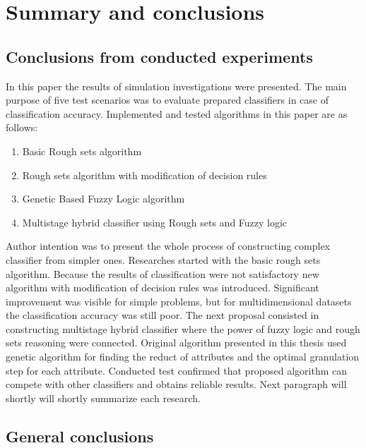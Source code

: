 \section{Summary and conclusions}
\label{cha:Summary}
\subsection{Conclusions from conducted experiments}
In this paper the results of simulation investigations were presented. The main
purpose of five test scenarios was to evaluate prepared classifiers in case of
classification accuracy. Implemented and tested algorithms in this paper are as follows:
\begin{enumerate}
    \item Basic Rough sets algorithm
    \item Rough sets algorithm with modification of decision rules
    \item Genetic Based Fuzzy Logic algorithm
    \item Multistage hybrid classifier using Rough sets and Fuzzy logic
\end{enumerate}
Author intention was to present the whole process of constructing complex
classifier from simpler ones. Researches started with the basic rough sets
algorithm. Because the results of classification were not satisfactory new
algorithm with modification of decision rules was introduced. Significant
improvement was visible for simple problems, but for multidimensional datasets
the classification accuracy was still poor. The next proposal consisted in
constructing multistage hybrid classifier where the power of fuzzy logic and
rough sets reasoning were connected. Original algorithm presented in this
thesis used genetic algorithm for finding the reduct of attributes and the
optimal granulation step for each attribute. Conducted test confirmed that
proposed algorithm can compete with other classifiers and obtains reliable
results. Next paragraph will shortly will shortly summarize each research. 


\subsection{General conclusions}
